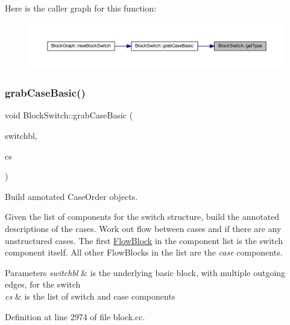 Here is the caller graph for this function\+:
\nopagebreak
\begin{figure}[H]
\begin{center}
\leavevmode
\includegraphics[width=350pt]{class_block_switch_a9796f852aa205ba32346ae9d249f94c1_icgraph}
\end{center}
\end{figure}
\mbox{\label{class_block_switch_ab6767a24f3c49d93a880e101ccef4b7f}} 
\subsubsection{\texorpdfstring{grabCaseBasic()}{grabCaseBasic()}}
{\footnotesize\ttfamily void Block\+Switch\+::grab\+Case\+Basic (\begin{DoxyParamCaption}\item[{\mbox{\hyperlink{class_flow_block}{Flow\+Block}} $\ast$}]{switchbl,  }\item[{const vector$<$ \mbox{\hyperlink{class_flow_block}{Flow\+Block}} $\ast$ $>$ \&}]{cs }\end{DoxyParamCaption})}



Build annotated Case\+Order objects. 

Given the list of components for the switch structure, build the annotated descriptions of the cases. Work out flow between cases and if there are any unstructured cases. The first \mbox{\hyperlink{class_flow_block}{Flow\+Block}} in the component list is the switch component itself. All other Flow\+Blocks in the list are the {\itshape case} components. 
\begin{DoxyParams}{Parameters}
{\em switchbl} & is the underlying basic block, with multiple outgoing edges, for the switch \\
\hline
{\em cs} & is the list of switch and case components \\
\hline
\end{DoxyParams}


Definition at line 2974 of file block.\+cc.

